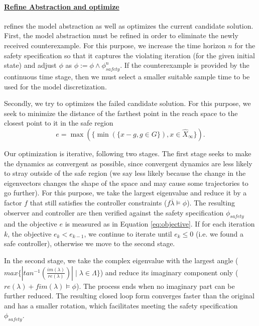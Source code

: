 \documentclass[sigconf]{llncs}
\renewcommand{\vec}[1]{{#1}}
\begin{document}
\paragraph{\underline{{\sc Refine Abstraction and optimize}}} refines the
model abstraction as well as optimizes the current candidate
solution.
%
First, the model abstraction must be refined in order to eliminate
the newly received counterexample. For this purpose,
we increase the time horizon $n$ for the
safety specification so that it captures the violating iteration
(for the given initial state) and adjust $\phi$ as 
$\phi := \phi \wedge \phi_\mathit{safety}^n$.
If the counterexample is provided by the {\sc continuous time} stage,
then we must select a smaller suitable sample time to be used
for the model discretization.


Secondly, we try to optimizes the failed candidate solution.
For this purpose, we seek to minimize the distance of the farthest point in the
reach space to the closest point to it in the safe region
\begin{equation}
e = \max(\{\min(\{\vec{x}-\vec{g}, \vec{g}\in G\}), \vec{x} \in \hat{X}_\infty \}).
\label{eq:objective}
\end{equation}

Our optimization is iterative, following two stages.  The first stage
seeks to make the dynamics as convergent as possible, since convergent
dynamics are less likely to stray outside of the safe region (we say
less likely because the change in the eigenvectors changes the shape
of the space and may cause some trajectories to go further). For this
purpose, we take the largest eigenvalue and reduce it by a factor $f$
that still satisfies the controller constraints ($f \overline{\lambda}
\models \phi$).  The resulting observer and controller are then
verified against the safety specification $\phi_\mathit{safety}$ and the
objective $e$ is measured as in Equation \eqref{eq:objective}.   If for
each iteration $k$, the objective $e_k<e_{k-1}$, we continue to
iterate until $e_k \leq 0$ (i.e. we found a safe controller),
otherwise we move to the second stage.

In the second stage, we take the complex eigenvalue
with the largest angle ($max\{|tan^{-1}\left(\frac{im(\lambda)}{re(\lambda)}\right)| \mid \lambda \in \Lambda\}$)
and reduce its imaginary component only  ($re(\lambda) + f im(\lambda) \models \phi$).
The process ends when no imaginary part can be further reduced.
The resulting closed loop form converges faster than the original and has a
smaller rotation, which facilitates meeting the safety specification $\phi_\mathit{safety}$.
\end{document}
